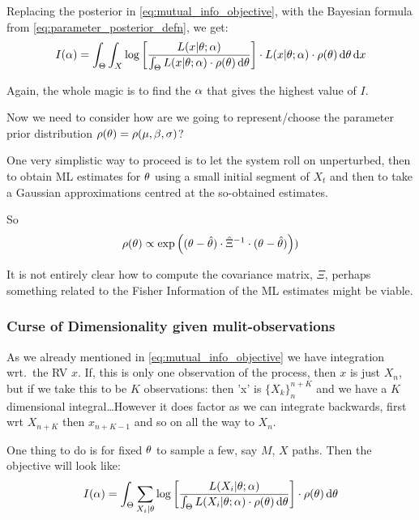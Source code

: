 Replacing the posterior in \cref{eq:mutual_info_objective}, with the Bayesian
formula from \cref{eq:parameter_posterior_defn}, we get:
\begin{equation}
I(\alpha) = \int_\Theta \int_X  \log\left[\frac{L(x|{ \theta}; \alpha)}
										{\int_\Theta L(x|{ \theta};\alpha)\cdot \rho({ \theta}) \, \mathrm{d} { \theta}} \right] \cdot L(x|
										{ \theta};\alpha) \cdot \rho({ \theta}) \, \mathrm{d} { \theta} \, \mathrm{d} x
\label{eq:mutual_info_objective_posteriored}
\end{equation}

Again, the whole magic is to find the $\alpha$ that gives the highest value of $I$.

Now we need to consider how are we going to represent/choose the parameter prior
distribution $\rho({ \theta}) = \rho({\mu },\beta,\sigma)$? 

One very simplistic way to proceed is to let the system roll on unperturbed,
then to obtain ML estimates for ${ \theta}$ using a small initial segment of $X_t$
and then to take a Gaussian approximations centred at the so-obtained estimates. 
 
So  
\begin{equation}
\rho({ \theta}) \propto 
\exp\left( ({ \theta} - \hat{{ \theta}}) \cdot \hat\Xi^{-1} \cdot ({ \theta}-\hat{{ \theta}})\right))
\label{eq:prior_gaussian_approxmn}
\end{equation}

It is not entirely clear how to compute the covariance matrix, $\Xi$, perhaps
something related to the Fisher Information of the ML estimates might be viable. 

 \subsubsection{Curse of Dimensionality given mulit-observations}

As we already mentioned in \cref{eq:mutual_info_objective} we have integration
wrt.\ the RV $x$. If, this is only one observation of the process, then $x$ is
just $X_n$, but if we take this to be $K$ observations: then 'x' is
$\{X_k\}_n^{n+K}$ and we have a $K$ dimensional integral\ldots However it does
factor as we can integrate backwards, first wrt $X_{n+K}$ then $x_{n+K-1}$ and
so on all the way to $X_{n}$.

One thing to do is for fixed ${ \theta}$ to sample a few, say $M$, $X$ paths. Then the
objective will look like:
\begin{equation}
I(\alpha) = \int_\Theta \sum_{X_i|{ \theta}}  \log\left[\frac{L(X_i|{ \theta}; \alpha)}
										{\int_\Theta L(X_i|{ \theta};\alpha)\cdot \rho({ \theta})\, \mathrm{d} { \theta}} \right]
										 \cdot \rho({ \theta}) \, \mathrm{d} { \theta}
\label{eq:mutual_info_objective_particlized}
\end{equation}

